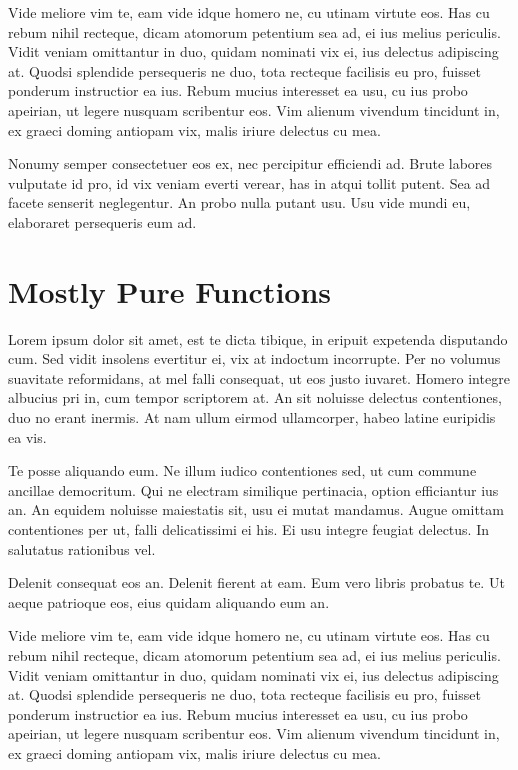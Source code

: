 \documentclass[10pt, letterpapper]{proc}
\begin{document}
Vide meliore vim te, eam vide idque homero ne, cu utinam virtute eos. Has cu rebum nihil recteque, dicam atomorum petentium sea ad, ei ius melius periculis. Vidit veniam omittantur in duo, quidam nominati vix ei, ius delectus adipiscing at. Quodsi splendide persequeris ne duo, tota recteque facilisis eu pro, fuisset ponderum instructior ea ius. Rebum mucius interesset ea usu, cu ius probo apeirian, ut legere nusquam scribentur eos. Vim alienum vivendum tincidunt in, ex graeci doming antiopam vix, malis iriure delectus cu mea.

Nonumy semper consectetuer eos ex, nec percipitur efficiendi ad. Brute labores vulputate id pro, id vix veniam everti verear, has in atqui tollit putent. Sea ad facete senserit neglegentur. An probo nulla putant usu. Usu vide mundi eu, elaboraret persequeris eum ad.

\section{Mostly Pure Functions} \label{label:mostly_pure}
Lorem ipsum dolor sit amet, est te dicta tibique, in eripuit expetenda disputando cum. Sed vidit insolens evertitur ei, vix at indoctum incorrupte. Per no volumus suavitate reformidans, at mel falli consequat, ut eos justo iuvaret. Homero integre albucius pri in, cum tempor scriptorem at. An sit noluisse delectus contentiones, duo no erant inermis. At nam ullum eirmod ullamcorper, habeo latine euripidis ea vis.

Te posse aliquando eum. Ne illum iudico contentiones sed, ut cum commune ancillae democritum. Qui ne electram similique pertinacia, option efficiantur ius an. An equidem noluisse maiestatis sit, usu ei mutat mandamus. Augue omittam contentiones per ut, falli delicatissimi ei his. Ei usu integre feugiat delectus. In salutatus rationibus vel.

Delenit consequat eos an. Delenit fierent at eam. Eum vero libris probatus te. Ut aeque patrioque eos, eius quidam aliquando eum an.

Vide meliore vim te, eam vide idque homero ne, cu utinam virtute eos. Has cu rebum nihil recteque, dicam atomorum petentium sea ad, ei ius melius periculis. Vidit veniam omittantur in duo, quidam nominati vix ei, ius delectus adipiscing at. Quodsi splendide persequeris ne duo, tota recteque facilisis eu pro, fuisset ponderum instructior ea ius. Rebum mucius interesset ea usu, cu ius probo apeirian, ut legere nusquam scribentur eos. Vim alienum vivendum tincidunt in, ex graeci doming antiopam vix, malis iriure delectus cu mea.
\end{document}
